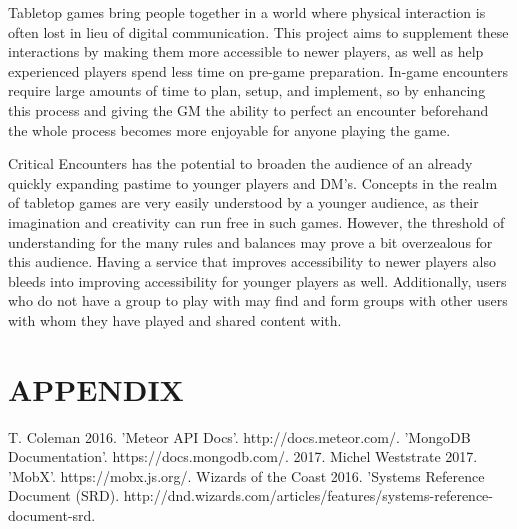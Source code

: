 \documentclass[letterpaper, 10 pt, conference]{ieeeconf}
\begin{document}
Tabletop games bring people together in a world where physical interaction is
often lost in lieu of digital communication. This project aims to supplement these
interactions by making them more accessible to newer players, as well as help
experienced players spend less time on pre-game preparation. In-game encounters
require large amounts of time to plan, setup, and implement, so by enhancing
this process and giving the GM the ability to perfect an encounter beforehand the
whole process becomes more enjoyable for anyone playing the game.
\par Critical Encounters has the potential to broaden the audience of an already quickly
expanding pastime to younger players and DM’s. Concepts in the realm of tabletop
games are very easily understood by a younger audience, as their imagination and
creativity can run free in such games. However, the threshold of understanding
for the many rules and balances may prove a bit overzealous for this audience.
Having a service that improves accessibility to newer players  also bleeds
into improving accessibility for younger players as well. Additionally, users who
do not have a group to play with may find and form groups with other users with
whom they have played and shared content with.

\section*{APPENDIX}

\listoffigures

\begin{thebibliography}{99}

 T. Coleman 2016. 'Meteor API Docs'. http://docs.meteor.com/.
 'MongoDB Documentation'. https://docs.mongodb.com/. 2017.
 Michel Weststrate 2017. 'MobX'. https://mobx.js.org/.
 Wizards of the Coast 2016. 'Systems Reference Document (SRD). http://dnd.wizards.com/articles/features/systems-reference-document-srd.

\end{thebibliography}
\end{document}
